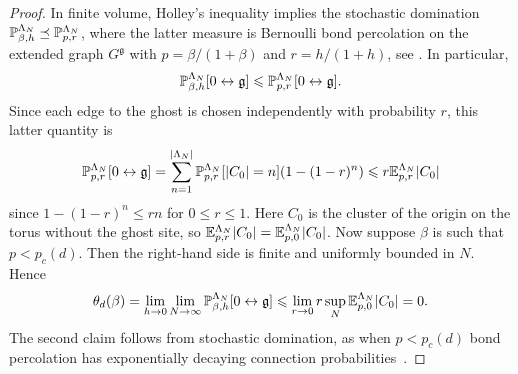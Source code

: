 \documentclass[11pt]{amsart}
\numberwithin{equation}{section}
\numberwithin{theorem}{section}
\newcommand{\ghost}{\mathfrak{g}}
\newcommand{\conn}{\leftrightarrow}
\newcommand{\1}{{\bf 1}}
\begin{document}
\begin{proof}
  In finite volume, Holley's inequality implies the stochastic
  domination
  $\P^{\Lambda_{N}}_{\beta,h}\preceq \P^{\Lambda_{N}}_{p,r}$, where
  the latter measure is Bernoulli bond percolation on the  extended
  graph $G^{\ghost}$ with $p=\beta/(1+\beta)$ and $r=h/(1+h)$, see
    \cite[Appendix~A]{MR4218682}.  In particular,
  \begin{equation}
    \P^{\Lambda_{N}}_{\beta,h}[0\conn \ghost] \leq \P^{\Lambda_{N}}_{p,r}[0\conn\ghost].
  \end{equation}
  Since each edge to the ghost is chosen independently with
  probability $r$, this latter quantity is
  \begin{equation}
    \P^{\Lambda_{N}}_{p,r}[0\conn\ghost] = \sum_{n=1}^{|\Lambda_{N}|}
    \P^{\Lambda_{N}}_{p,r}[\abs{C_0}=n](1-(1-r)^{n}) \leq r
    \E^{\Lambda_{N}}_{p,r}\abs{C_0}
  \end{equation}
  since $1-(1-r)^{n}\leq rn$ for $0\leq r\leq 1$. Here $C_0$ is the cluster
  of the origin on the torus without the ghost site, so
  $\E^{\Lambda_{N}}_{p,r}\abs{C_0}=\E^{\Lambda_{N}}_{p,0}\abs{C_0}$.
  Now suppose $\beta$ is such that $p<p_{c}(d)$. Then
  the right-hand side
  is finite and uniformly bounded in $N$. Hence
  \begin{equation}
    \theta_d(\beta) = 
    \lim_{h\to 0}\lim_{N\to\infty}\P^{\Lambda_{N}}_{\beta,h}[0\conn \ghost] 
    \leq 
    \lim_{r\to 0}r \sup_{N}\E^{\Lambda_{N}}_{p,0}\abs{C_0} = 0.
  \end{equation}
  The second claim follows from stochastic domination, as when
  $p<p_{c}(d)$ bond percolation has exponentially decaying
  connection probabilities~\cite{MR1707339}.
\end{proof}
\end{document}
